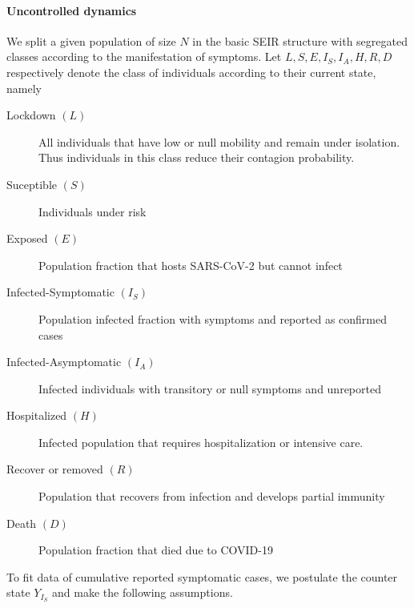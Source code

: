 \paragraph{Uncontrolled dynamics}
    We split a given population of size $N$ in the basic SEIR
structure with segregated classes according to the manifestation
of symptoms. Let $L, S, E, I_S, I_A, H, R, D$ respectively denote the
class of individuals according to their current state, namely
%
\begin{description}
    \item[Lockdown $(L)$]
        All individuals that have low or null mobility and remain under
        isolation. Thus individuals in this class reduce their contagion probability.
    \item[Suceptible $(S)$]
        Individuals under risk
    \item[Exposed $(E)$]
        Population fraction that hosts SARS-CoV-2 but cannot infect
    \item[Infected-Symptomatic $(I_S)$]
        Population infected fraction with symptoms and reported as confirmed
        cases
    \item[Infected-Asymptomatic $(I_A)$]
        Infected individuals with transitory or null symptoms and unreported
    \item[Hospitalized $(H)$]
        Infected population that requires hospitalization or intensive care.
    \item[Recover or removed $(R)$]
        Population that recovers from infection and develops partial immunity
    \item[Death $(D)$]
        Population fraction that died due to COVID-19
\end{description}
%
To fit data of cumulative reported symptomatic cases, we
postulate the counter state $Y_{I_S}$ and make the following assumptions.
%
%
